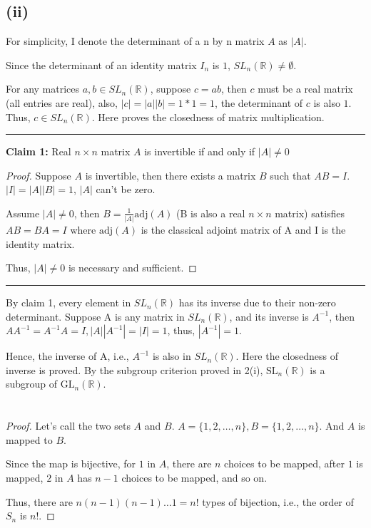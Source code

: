 \documentclass[12pt]{article}
\begin{document}
\subsection*{(ii)}
For simplicity, I denote the determinant of a n by n matrix $A$ as $|A|$.

Since the determinant of an identity matrix $I_n$ is $1$, $SL_n(\mathbb{R})\ne \emptyset$.

For any matrices $a,b\in SL_n(\mathbb{R})$, suppose $c=ab$, then $c$ must be a real matrix (all entries are real), also, $|c|=|a||b|=1*1=1$, the determinant of $c$ is also $1$. Thus, $c\in SL_n(\mathbb{R})$. Here proves the closedness of matrix multiplication.

\noindent\rule{\textwidth}{1pt}
\noindent \textbf{Claim 1: } Real $n\times n$ matrix $A$ is invertible if and only if $|A|\ne0$
\begin{proof}
Suppose $A$ is invertible, then there exists a matrix $B$ such that $AB=I$. $|I|=|A||B|=1$, $|A|$ can't be zero. 

Assume $|A|\ne 0$, then $B=\frac{1}{|A|}\mathrm{adj}(A)$ (B is also a real $n\times n$ matrix) satisfies $AB=BA=I$ where $\mathrm{adj}(A)$ is the classical adjoint matrix of A and I is the identity matrix.

Thus, $|A|\ne 0$ is necessary and sufficient.
\end{proof}
\noindent\rule{\textwidth}{1pt}

By claim 1, every element in $SL_n(\mathbb{R})$ has its inverse due to their non-zero determinant. Suppose A is any matrix in $SL_n(\mathbb{R})$, and its inverse is $A^{-1}$, then $AA^{-1}=A^{-1}A=I,|A||A^{-1}|=|I|=1$, thus, $|A^{-1}|=1$.

Hence, the inverse of A, i.e., $A^{-1}$ is also in $SL_n(\mathbb{R})$. Here the closedness of inverse is proved. By the subgroup criterion proved in 2(i), $\mathrm{SL}_n({\mathbb{R}})$ is a subgroup of $\mathrm{GL}_n({\mathbb{R}})$.


\newpage
\section{} %
\subsection{} %
\begin{proof}
Let's call the two sets $A$ and $B$. $A=\{1,2,\dots,n\},B=\{1,2,\dots,n\}$. And $A$ is mapped to $B$.

Since the map is bijective, for $1$ in $A$, there are $n$ choices to be mapped, after $1$ is mapped, $2$ in $A$ has $n-1$ choices to be mapped, and so on.

Thus, there are $n(n-1)(n-1)\dots1=n!$ types of bijection, i.e., the order of $S_n$ is $n!$.
\end{proof}
\end{document}
